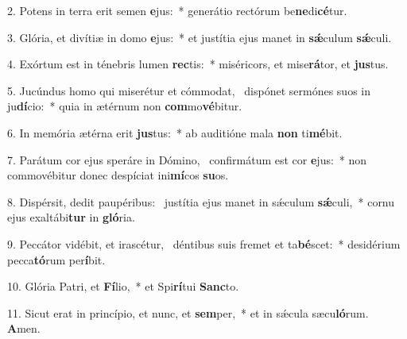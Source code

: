 2. Potens in terra erit semen \textbf{e}jus:~*  generátio rectórum be\textbf{ne}di\textbf{cé}tur.\

3. Glória, et divítiæ in domo \textbf{e}jus:~*  et justítia ejus manet in \textbf{sǽ}culum \textbf{sǽ}culi.\

4. Exórtum est in ténebris lumen \textbf{rec}tis:~*  miséricors, et mise\textbf{rá}tor, et \textbf{jus}tus.\

5. Jucúndus homo qui miserétur et cómmodat, \dag\  dispónet sermónes suos in ju\textbf{dí}cio:~*  quia in ætérnum non \textbf{com}mo\textbf{vé}bitur.\

6. In memória ætérna erit \textbf{jus}tus:~*  ab auditióne mala \textbf{non} ti\textbf{mé}bit.\

7. Parátum cor ejus speráre in Dómino, \dag\  confirmátum est cor \textbf{e}jus:~*  non commovébitur donec despíciat ini\textbf{mí}cos \textbf{su}os.\

8. Dispérsit, dedit paupéribus: \dag\  justítia ejus manet in sǽculum \textbf{sǽ}culi,~*  cornu ejus exaltábi\textbf{tur} in \textbf{gló}ria.\

9. Peccátor vidébit, et irascétur, \dag\  déntibus suis fremet et ta\textbf{bé}scet:~*  desidérium pecca\textbf{tó}rum per\textbf{í}bit.\

10. Glória Patri, et \textbf{Fí}lio,~*  et Spi\textbf{rí}tui \textbf{Sanc}to.\

11. Sicut erat in princípio, et nunc, et \textbf{sem}per,~*  et in sǽcula sæcu\textbf{ló}rum. \textbf{A}men.\

